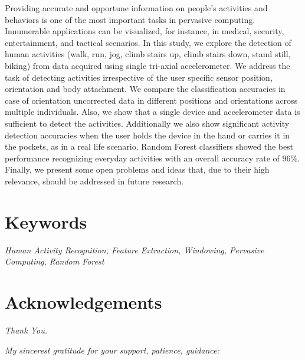 \documentclass[
10pt,           %
a4paper,        %
oneside,        %
headinclude,footinclude, %
]{scrartcl}
\begin{document}
Providing accurate and opportune information on people’s activities and behaviors is one of the most important tasks in pervasive computing. Innumerable applications can be visualized, for instance, in medical, security, entertainment, and tactical scenarios. In this study, we explore the detection of human activities (walk, run, jog, climb stairs up, climb stairs down, stand still, biking) from data acquired using single tri-axial accelerometer. We address the task of detecting activities irrespective of the user specific sensor position, orientation and body attachment. We compare the classification accuracies in case of orientation uncorrected data in different positions and orientations across multiple individuals. Also, we show that a single device and accelerometer data is sufficient to detect the activities. Additionally we also show significant activity detection accuracies when the user holds the device in the hand or carries it in the pockets, as in a real life scenario. Random Forest classifiers showed the best performance recognizing everyday activities with an overall accuracy rate of $96\%$. Finally, we present some open problems and ideas that, due to their high relevance, should be addressed in future research.

\section*{Keywords}
\textit{Human Activity Recognition, Feature Extraction, Windowing, Pervasive Computing, Random Forest}

\newpage

\section*{Acknowledgements}

\setlength{\parindent}{0em}
\setlength{\parskip}{0.5em}

\emph{Thank You.}

\emph{My sincerest gratitude for your support, patience, guidance:}
\end{document}
